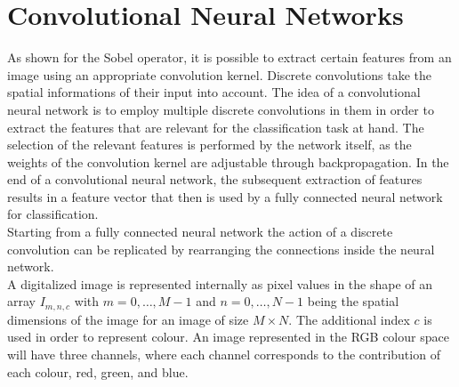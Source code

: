 \section{Convolutional Neural Networks}
\label{sec:CNN}

As shown for the Sobel operator, it is possible to extract certain features from an image using an appropriate convolution kernel. Discrete convolutions take the spatial informations of their input into account. The idea of a convolutional neural network is to employ multiple discrete convolutions in them in order to extract the features that are relevant for the classification task at hand. The selection of the relevant features is performed by the network itself, as the weights of the convolution kernel are adjustable through backpropagation. In the end of a convolutional neural network, the subsequent extraction of features results in a feature vector that then is used by a fully connected neural network for classification.\\

Starting from a fully connected neural network the action of a discrete convolution can be replicated by rearranging the connections inside the neural network. \\ %

A digitalized image is represented internally as pixel values in the shape of an array $I_{m,n,c}$ with $m=0,\dots ,M-1$ and $n=0,\dots ,N-1$ being the spatial dimensions of the image for an image of size $M\times N$. The additional index $c$ is used in order to represent colour. An image represented in the RGB colour space will have three channels, where each channel corresponds to the contribution of each colour, red, green, and blue. \\

